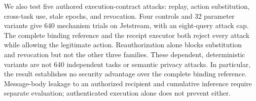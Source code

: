 We also test five authored execution-contract attacks: replay, action substitution,
cross-task use, stale epochs, and revocation. Four controls and 32 parameter
variants give 640 mechanism trials on Jetstream, with an eight-query attack cap.
The complete binding reference and the receipt executor both reject every attack
while allowing the legitimate action. Reauthorization alone blocks substitution
and revocation but not the other three families. These dependent, deterministic
variants are not 640 independent tasks or semantic privacy attacks. In particular,
the result establishes no security advantage over the complete binding reference.
Message-body leakage to an authorized recipient and cumulative inference require
separate evaluation; authenticated execution alone does not prevent either.
